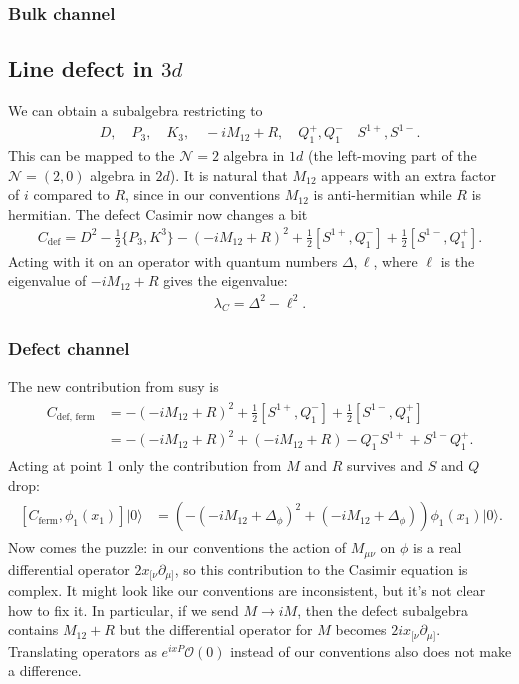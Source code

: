 \documentclass[letterpaper]{article}
\let\Oldsubsection\subsection
\renewcommand{\subsection}{\FloatBarrier\Oldsubsection}
\let\Oldsubsubsection\subsubsection
\renewcommand{\subsubsection}{\FloatBarrier\Oldsubsubsection}
\def\Nm{{\mathcal{N}}}
\def\Om{{\mathcal{O}}}
\begin{document}
\subsubsection{Bulk channel}

\subsection{Line defect in \texorpdfstring{$3d$}{3d}}

We can obtain a subalgebra restricting to
\begin{align}
 D, \quad
 P_3, \quad
 K_3, \quad
 -iM_{12} + R, \quad
 Q^+_1, Q^-_1 \quad
 S^{1+}, S^{1-}.
\end{align}
This can be mapped to the $\Nm = 2$ algebra in $1d$ (the left-moving part of the $\Nm = (2,0)$ algebra in $2d$).
It is natural that $M_{12}$ appears with an extra factor of $i$ compared to $R$, since in our conventions $M_{12}$ is anti-hermitian while $R$ is hermitian.
The defect Casimir now changes a bit
\begin{align}
 C_{\text{def}} = 
    D^2
  - \frac12 \{ P_{3}, K^{3} \}
  - (-iM_{12} + R)^2
  + \frac12 [ S^{1+}, Q^-_1]
  + \frac12 [ S^{1-}, Q^+_1].
\end{align}
Acting with it on an operator with quantum numbers $\Delta, \ell$, where $\ell$ is the eigenvalue of $-i M_{12} + R$ gives the eigenvalue:
\begin{align}
 \lambda_C 
 = \Delta^2
 - \ell^2.
\end{align}

\subsubsection{Defect channel}

The new contribution from susy is
\begin{align}
\begin{split}
 C_{\text{def, ferm}} 
 & = 
  - (-i M_{12} + R)^2
  + \frac12 [ S^{1+}, Q^-_1]
  + \frac12 [ S^{1-}, Q^+_1] \\
 & =
  - (-iM_{12} + R)^2
  + (-iM_{12} + R)
  - Q^-_1 S^{1+}
  + S^{1-} Q^+_1.
\end{split}
\end{align}
Acting at point 1 only the contribution from $M$ and $R$ survives and $S$ and $Q$ drop:
\begin{align}
\begin{split}
 [C_{\text{ferm}}, \phi_1(x_1) ] |0\rangle
 & = \left(   - (-iM_{12} + \Delta_\phi)^2
  + (-iM_{12} + \Delta_\phi) \right) \phi_1(x_1) |0\rangle.
\end{split}
\end{align}
Now comes the puzzle: in our conventions the action of $M_{\mu\nu}$ on $\phi$ is a real differential operator $2 x_{[\nu}\partial_{\mu]}$, so this contribution to the Casimir equation is complex.
It might look like our conventions are inconsistent, but it's not clear how to fix it.
In particular, if we send $M \to i M$, then the defect subalgebra contains $M_{12} + R$ but the differential operator for $M$ becomes $2 i x_{[\nu}\partial_{\mu]}$.
Translating operators as $e^{ixP} \Om(0)$ instead of our conventions also does not make a difference.
\end{document}
